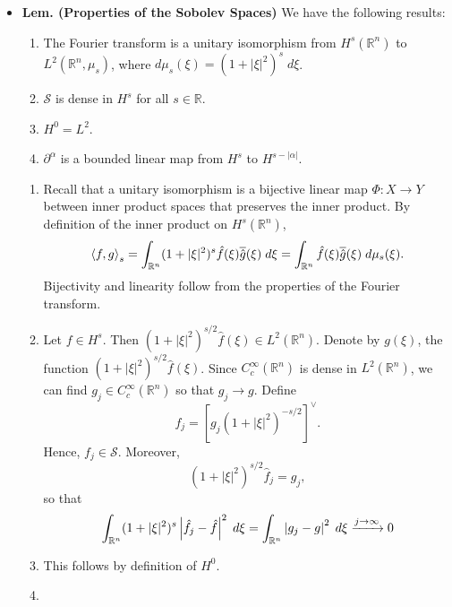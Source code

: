 \documentclass{article}
\begin{document}
\begin{itemize}
	\item \textbf{Lem. (Properties of the Sobolev Spaces)} We have the following results: \vspace{-0.25cm}
		\begin{enumerate}[itemsep =-2pt,label = (\arabic{*})]
			\item The Fourier transform is a unitary isomorphism from $H^{s}(\mathbb{R}^{n})$ to $L^{2}(\mathbb{R}^{n},\mu_{s})$, where $d\mu_{s}(\xi) = (1 + |\xi|^{2})^{s}\;d\xi$. 
			\item $\mathcal{S}$ is dense in $H^{s}$ for all $s \in \mathbb{R}$. 
			\item $H^{0} = L^{2}$. 
			\item $\partial^{\alpha}$ is a bounded linear map from $H^{s}$ to $H^{s - |\alpha|}$. 
		\end{enumerate}
	\begin{solutions}
		\begin{enumerate}[itemsep =-2pt,label = (\arabic{*})]
			\item Recall that a unitary isomorphism is a bijective linear map $\varPhi: X \to Y$ between inner product spaces that preserves the inner product. By definition of the inner product on $H^{s}(\mathbb{R}^{n})$, 
				\begin{equation}
					\braket{f, g}_{s} = \int_{\mathbb{R}^{n}}(1 + |\xi|^{2})^{s}\hat{f}(\xi)\overline{\hat{g}}(\xi)\;d\xi = \int_{\mathbb{R}^{n}}\hat{f}(\xi)\overline{\hat{g}}(\xi)\;d\mu_{s}(\xi). 
				\end{equation}
			Bijectivity and linearity follow from the properties of the Fourier transform. 
			\item Let $f \in H^{s}$. Then $(1 + |\xi|^{2})^{s/2}\hat{f}(\xi) \in L^{2}(\mathbb{R}^{n})$. Denote by $g(\xi)$, the function $(1 + |\xi|^{2})^{s/2}\hat{f}(\xi)$. Since $C_{c}^{\infty}(\mathbb{R}^{n})$ is dense in $L^{2}(\mathbb{R}^{n})$, we can find $g_{j} \in C_{c}^{\infty}(\mathbb{R}^{n})$ so that $g_{j} \to g$. Define 
				\begin{equation}
					f_{j} = \left[g_{j}(1 + |\xi|^{2})^{-s/2}\right]^{\vee}. 
				\end{equation} 
			Hence, $f_{j} \in \mathcal{S}$. Moreover, 
				\begin{equation}
					(1 + |\xi|^{2})^{s/2}\hat{f}_{j} = g_{j}, 
				\end{equation}
			so that 
				\begin{equation}
					\int_{\mathbb{R}^{n}}(1 + |\xi|^{2})^{s}\left| \hat{f}_{j} - \hat{f} \right|^{2}\;d\xi = \int_{\mathbb{R}^{n}}\left| g_{j} - g \right|^{2}\;d\xi \xrightarrow{j \to \infty} 0
				\end{equation}
			\item This follows by definition of $H^{0}$. 
			\item 
		\end{enumerate}
	\end{solutions} 
\end{itemize}
\end{document}
